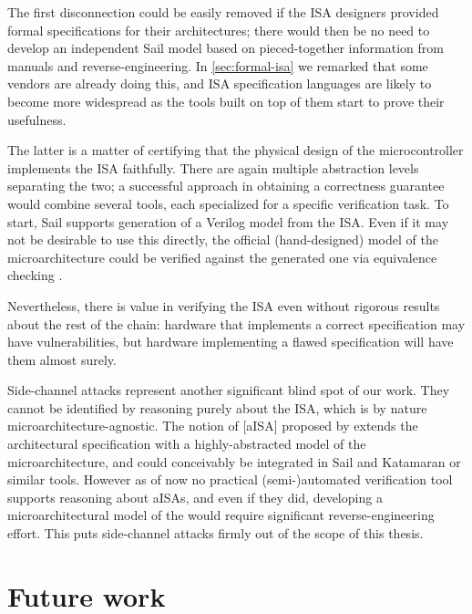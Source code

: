 The first disconnection could be easily removed if the ISA designers provided formal specifications for their architectures; there would then be no need to develop an independent Sail model based on pieced-together information from manuals and reverse-engineering. In \cref{sec:formal-isa} we remarked that some vendors are already doing this, and ISA specification languages are likely to become more widespread as the tools built on top of them start to prove their usefulness.

The latter is a matter of certifying that the physical design of the microcontroller implements the ISA faithfully. There are again multiple abstraction levels separating the two; a successful approach in obtaining a correctness guarantee would combine several tools, each specialized for a specific verification task. To start, Sail supports generation of a Verilog model from the ISA. Even if it may not be desirable to use this directly, the official (hand-designed) model of the microarchitecture could be verified against the generated one via equivalence checking \cite{Reid2016a}.

Nevertheless, there is value in verifying the ISA even without rigorous results about the rest of the chain: hardware that implements a correct specification may have vulnerabilities, but hardware implementing a flawed specification will have them almost surely.

Side-channel attacks represent another significant blind spot of our work. They cannot be identified by reasoning purely about the ISA, which is by nature microarchitecture-agnostic. The notion of [aISA] proposed by \cite{Ge2018} extends the architectural specification with a highly-abstracted model of the microarchitecture, and could conceivably be integrated in Sail and Katamaran or similar tools. However as of now no practical (semi-)automated verification tool supports reasoning about aISAs, and even if they did, developing a microarchitectural model of the \msp would require significant reverse-engineering effort. This puts side-channel attacks firmly out of the scope of this thesis.

\section{Future work}

